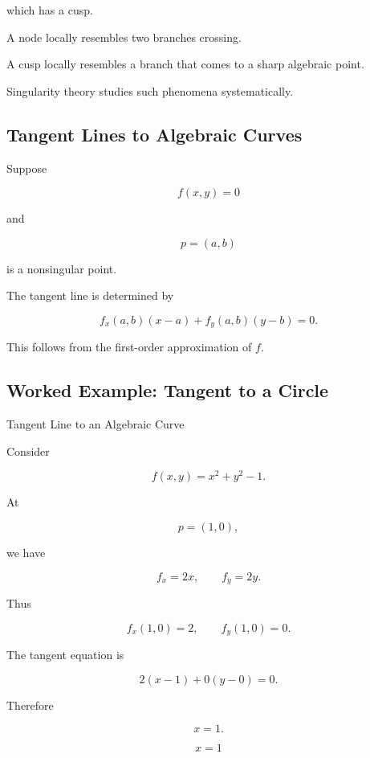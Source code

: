 which has a cusp.

A node locally resembles two branches crossing.

A cusp locally resembles a branch that comes to a sharp algebraic point.

Singularity theory studies such phenomena systematically.

\subsection{Tangent Lines to Algebraic Curves}
\label{subsec:tangent-lines-algebraic-curves}

Suppose

\[
f(x,y)=0
\]

and

\[
p=(a,b)
\]

is a nonsingular point.

The tangent line is determined by

\[
\boxed{
f_x(a,b)(x-a)
+
f_y(a,b)(y-b)
=
0.
}
\]

This follows from the first-order approximation of \(f\).

\subsection{Worked Example: Tangent to a Circle}
\label{subsec:worked-algebraic-tangent-circle}

\begin{workedexamplebox}{Tangent Line to an Algebraic Curve}

Consider

\[
f(x,y)=x^2+y^2-1.
\]

At

\[
p=(1,0),
\]

we have

\[
f_x=2x,
\qquad
f_y=2y.
\]

Thus

\[
f_x(1,0)=2,
\qquad
f_y(1,0)=0.
\]

The tangent equation is

\[
2(x-1)+0(y-0)=0.
\]

Therefore

\[
x=1.
\]

\begin{answerbox}
\[
\boxed{x=1}
\]
\end{answerbox}
\end{workedexamplebox}

